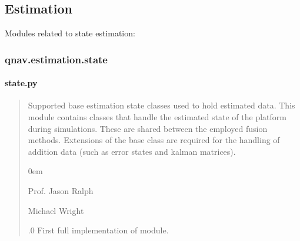 \documentclass[letterpaper,10pt,english]{sphinxmanual}
\begin{document}
\subsection{Estimation}
\label{\detokenize{usage/packages:estimation}}
\sphinxAtStartPar
Modules related to state estimation:

\sphinxstepscope


\subsubsection{qnav.estimation.state}
\label{\detokenize{modules/estimation/state:module-qnav.estimation.state}}\label{\detokenize{modules/estimation/state:qnav-estimation-state}}\label{\detokenize{modules/estimation/state::doc}}

\paragraph{state.py}
\label{\detokenize{modules/estimation/state:state-py}}\begin{quote}\begin{description}
\sphinxAtStartPar
Supported base estimation state classes used to hold estimated data.
This module contains classes that handle the estimated state of the
platform during simulations. These are shared between the employed
fusion methods. Extensions of the base class are required for the
handling of addition data (such as error states and kalman matrices).

\begin{DUlineblock}{0em}
\item[] Prof. Jason Ralph \sphinxhyphen{} 
\item[] Michael Wright \sphinxhyphen{} 
\end{DUlineblock}

.0 \sphinxhyphen{} First full implementation of module.

\end{description}\end{quote}
\end{document}
